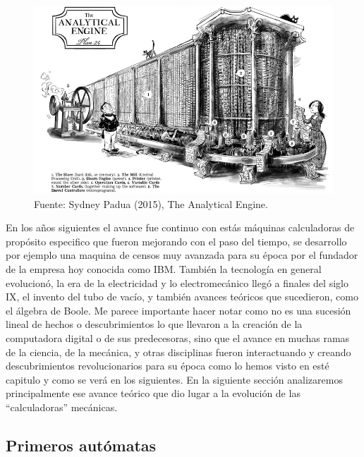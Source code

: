 \documentclass[letterpaper,12pt,oneside]{book}
\begin{document}
		\begin{figure}
		    \centering
		    \includegraphics[scale = 0.6]{media/Historia/analyticalEngine1_sydbeypadua.jpg}
		    \caption{Fuente: Sydney Padua (2015), The Analytical Engine.}
	    	\label{fig:analytical_engine}
		\end{figure}
				
		En los años siguientes el avance fue continuo con estás máquinas calculadoras de propósito especifico que fueron mejorando con el paso del tiempo, se desarrollo
		por ejemplo una maquina de censos muy avanzada para su época por el fundador de la empresa hoy conocida como IBM. También la tecnología en general evolucionó,
		la era de la electricidad y lo electromecánico llegó a finales del siglo IX, el invento del tubo de vacío, y también
		avances teóricos que sucedieron, como el álgebra de Boole. Me parece importante hacer notar como no es una sucesión lineal de hechos o descubrimientos
		lo que llevaron a la creación de la computadora digital o de sus predecesoras, sino que el avance en muchas ramas de la ciencia, de la mecánica, y otras
		disciplinas fueron interactuando y creando descubrimientos revolucionarios para su época como lo hemos visto en esté capitulo y como
		se verá en los siguientes. En la siguiente sección analizaremos principalmente ese avance teórico que dio lugar a la evolución de las ``calculadoras'' mecánicas.
		

		\clearpage		
		
		\subsection{Primeros autómatas}
		
\end{document}
